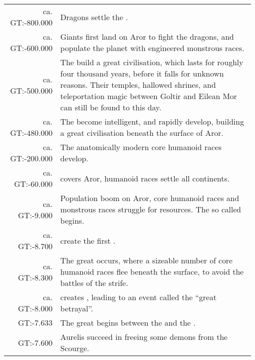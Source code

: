 \clearpage
\onecolumn
\begin{longtable}{@{\,}r <{\hskip 6pt} !{
  \color{LightSteelBlue3}
  \makebox[0pt]{\textbullet}
  \hskip -2.6pt
  \vrule width 1pt
  \hspace{\labelsep}
  }
  >{\raggedright\arraybackslash}p{11cm}
}
    ca. GT:-800.000  & Dragons settle the . \\
    ca. GT:-600.000  & Giants first land on Aror to fight the dragons, and
                       populate the planet with engineered monstrous races. \\
    ca. GT:-500.000  & The  build a great civilisation,
                       which lasts for roughly four thousand years, before it
                       falls for unknown reasons. Their temples, hallowed
                       shrines, and teleportation magic between Goltir and
                       Eilean Mor can still be found to this day. \\
    ca. GT:-480.000  & The  become intelligent, and rapidly
                       develop, building a great civilisation beneath the
                       surface of Aror. \\
    ca. GT:-200.000  & The anatomically modern core humanoid races develop. \\
    ca. GT:-60.000   &  covers Aror, humanoid races
                       settle all continents. \\
    ca. GT:-9.000    & Population boom on Aror, core humanoid races and
                       monstrous races struggle for resources. The so called
                        begins. \\
    ca. GT:-8.700    &  create the first .\\
    ca. GT:-8.300    & The great  occurs, where a sizeable
                       number of core humanoid races flee beneath the surface,
                       to avoid the battles of the strife. \\
    ca. GT:-8.000    &  creates ,
                       leading to an event called the ``great betrayal''. \\
    GT:-7.633        & The great  begins between the
                        and the . \\
    GT:-7.600        & Aurelis succeed in freeing some demons from the Scourge.

\end{longtable}
